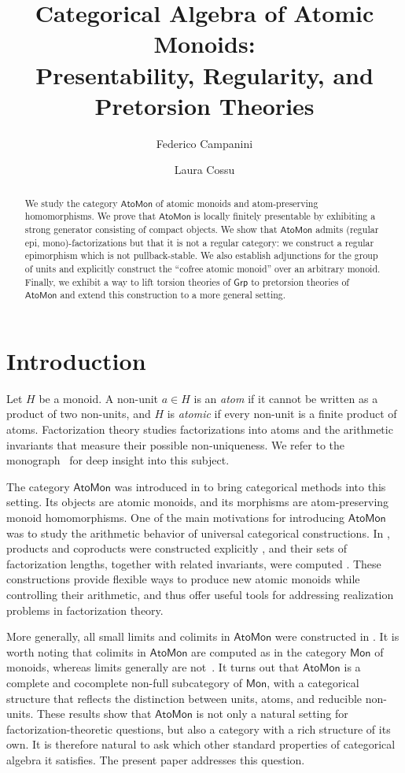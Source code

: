 \documentclass[a4paper,10pt,reqno]{amsart}
\title[Categorical Algebra of Atomic Monoids]
{Categorical Algebra of Atomic Monoids:\\ Presentability, Regularity, and Pretorsion Theories}
\author{Federico Campanini}
\author{Laura Cossu}
\theoremstyle{definition}
\theoremstyle{remark}
\newcommand{\AtoMon}{\mathsf{AtoMon}}
\newcommand{\Mon}{\mathsf{Mon}}
\newcommand{\Grp}{\mathsf{Grp}}
\begin{document}
\begin{abstract}
We study the category $\AtoMon$ of atomic monoids and atom-preserving homomorphisms. We prove that $\AtoMon$ is locally finitely presentable by exhibiting a strong generator consisting of compact objects. We show that $\AtoMon$ admits (regular epi, mono)-factorizations but that it is not a regular category: we construct a regular epimorphism which is not pullback-stable. We also establish adjunctions for the group of units and explicitly construct the ``cofree atomic monoid'' over an arbitrary monoid. Finally, we exhibit a way to lift torsion theories of $\Grp$ to pretorsion theories of $\AtoMon$ and extend this construction to a more general setting.
\end{abstract}


\maketitle

\section{Introduction}

Let $H$ be a monoid. A non-unit $a\in H$ is an \emph{atom} if it cannot be written as a product of two non-units, and $H$ is \emph{atomic} if every non-unit is a finite product of atoms. Factorization theory studies factorizations into atoms and the arithmetic invariants that measure their possible non-uniqueness. We refer to the monograph~\cite{GeHK06} for deep insight into this subject.

The category $\AtoMon$ was introduced in \cite{CCT} to bring categorical methods into this setting. Its objects are atomic monoids, and its morphisms are atom-preserving monoid homomorphisms. One of the main motivations for introducing $\AtoMon$ was to study the arithmetic behavior of universal categorical constructions. In \cite{CCT}, products and coproducts were constructed explicitly \cite[Theorems~4.6 and~5.4]{CCT}, and their sets of factorization lengths, together with related invariants, were computed \cite[Theorems~4.10 and~5.7]{CCT}. These constructions provide flexible ways to produce new atomic monoids while controlling their arithmetic, and thus offer useful tools for addressing realization problems in factorization theory.

More generally, all small limits and colimits in $\AtoMon$ were constructed in \cite{CCT}. It is worth noting that colimits in $\AtoMon$ are computed as in the category $\Mon$ of monoids, whereas limits generally are not~\cite[Theorems~6.3 and~6.6]{CCT}. It turns out that $\AtoMon$ is a complete and cocomplete non-full subcategory of $\Mon$, with a categorical structure that reflects the distinction between units, atoms, and reducible non-units. These results show that $\AtoMon$ is not only a natural setting for factorization-theoretic questions, but also a category with a rich structure of its own. It is therefore natural to ask which other standard properties of categorical algebra it satisfies. The present paper addresses this question.
\end{document}
